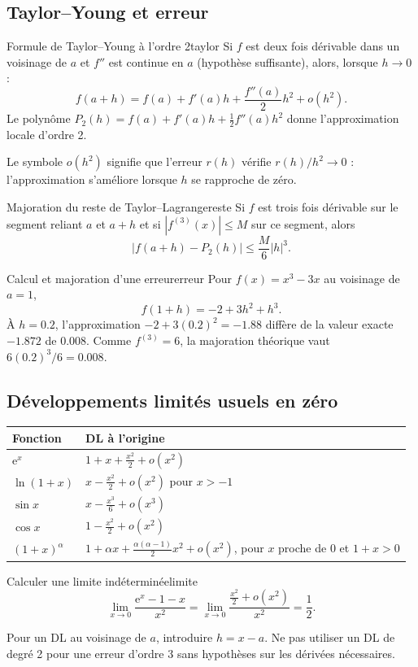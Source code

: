 \documentclass[11pt,a4paper,oneside]{article}
\newcommand{\e}{\mathrm e}
\begin{document}
\subsection{Taylor--Young et erreur}
\begin{theoreme}{Formule de Taylor--Young à l'ordre 2}{taylor}
Si $f$ est deux fois dérivable dans un voisinage de $a$ et $f''$ est continue en $a$ (hypothèse suffisante), alors, lorsque $h\to0$ :
\[ f(a+h)=f(a)+f'(a)h+\frac{f''(a)}2h^2+o(h^2). \]
Le polynôme $P_2(h)=f(a)+f'(a)h+\frac12f''(a)h^2$ donne l'approximation locale d'ordre 2.
\end{theoreme}
Le symbole $o(h^2)$ signifie que l'erreur $r(h)$ vérifie $r(h)/h^2\to0$ : l'approximation s'améliore lorsque $h$ se rapproche de zéro.
\begin{theoreme}{Majoration du reste de Taylor--Lagrange}{reste}
Si $f$ est trois fois dérivable sur le segment reliant $a$ et $a+h$ et si $|f^{(3)}(x)|\le M$ sur ce segment, alors
\[ |f(a+h)-P_2(h)|\le\frac{M}{6}|h|^3. \]
\end{theoreme}
\begin{exemple}{Calcul et majoration d'une erreur}{erreur}
Pour $f(x)=x^3-3x$ au voisinage de $a=1$,
\[f(1+h)=-2+3h^2+h^3.\]
À $h=0.2$, l'approximation $-2+3(0.2)^2=-1.88$ diffère de la valeur exacte $-1.872$ de $0.008$. Comme $f^{(3)}=6$, la majoration théorique vaut $6(0.2)^3/6=0.008$.
\end{exemple}

\subsection{Développements limités usuels en zéro}
\begin{center}\begin{tabularx}{\textwidth}{@{}lX@{}}\toprule
\textbf{Fonction} & \textbf{DL à l'origine}\\\midrule
$\e^x$ & $1+x+\frac{x^2}{2}+o(x^2)$\\[1mm]
$\ln(1+x)$ & $x-\frac{x^2}{2}+o(x^2)$ pour $x>-1$\\[1mm]
$\sin x$ & $x-\frac{x^3}{6}+o(x^3)$\\[1mm]
$\cos x$ & $1-\frac{x^2}{2}+o(x^2)$\\[1mm]
$(1+x)^\alpha$ & $1+\alpha x+\frac{\alpha(\alpha-1)}2x^2+o(x^2)$, pour $x$ proche de $0$ et $1+x>0$\\\bottomrule
\end{tabularx}\end{center}
\begin{exemple}{Calculer une limite indéterminée}{limite}
\[\lim_{x\to0}\frac{\e^x-1-x}{x^2}=
\lim_{x\to0}\frac{\frac{x^2}{2}+o(x^2)}{x^2}=\frac12.\]
\end{exemple}
\begin{attentionbox}
Pour un DL au voisinage de $a$, introduire $h=x-a$. Ne pas utiliser un DL de degré 2 pour une erreur d'ordre 3 sans hypothèses sur les dérivées nécessaires.
\end{attentionbox}
\end{document}
